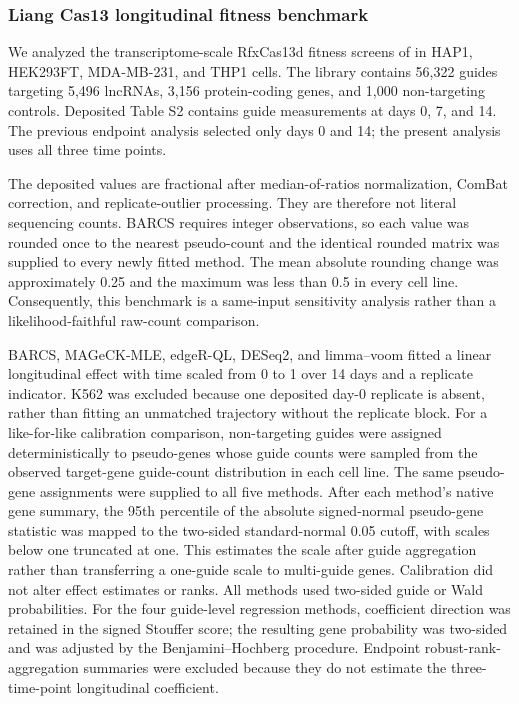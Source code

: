 \subsubsection{Liang Cas13 longitudinal fitness benchmark}

We analyzed the transcriptome-scale RfxCas13d fitness screens of
\citet{liang2026lncrna} in HAP1, HEK293FT, MDA-MB-231, and THP1 cells.
The library contains 56,322 guides targeting 5,496 lncRNAs, 3,156
protein-coding genes, and 1,000 non-targeting controls.  Deposited Table S2
contains guide measurements at days 0, 7, and 14.  The previous endpoint
analysis selected only days 0 and 14; the present analysis uses all three time
points.

The deposited values are fractional after median-of-ratios normalization,
ComBat correction, and replicate-outlier processing.  They are therefore not
literal sequencing counts.  BARCS requires integer observations, so each value
was rounded once to the nearest pseudo-count and the identical rounded matrix
was supplied to every newly fitted method.  The mean absolute rounding change
was approximately 0.25 and the maximum was less than 0.5 in every cell line.
Consequently, this benchmark is a same-input sensitivity analysis rather than
a likelihood-faithful raw-count comparison.

BARCS, MAGeCK-MLE, edgeR-QL, DESeq2, and limma--voom fitted a linear
longitudinal effect with time scaled from 0 to 1 over 14 days and a replicate
indicator.  K562 was excluded because one deposited day-0 replicate is absent,
rather than fitting an unmatched trajectory without the replicate block.
For a like-for-like calibration comparison, non-targeting guides were assigned
deterministically to pseudo-genes whose guide counts were sampled from the
observed target-gene guide-count distribution in each cell line.  The same
pseudo-gene assignments were supplied to all five methods.  After each
method's native gene summary, the 95th percentile of the absolute
signed-normal pseudo-gene statistic was mapped to the two-sided standard-normal
0.05 cutoff, with scales below one truncated at one.  This estimates the scale
after guide aggregation rather than transferring a one-guide scale to
multi-guide genes.  Calibration did not alter effect estimates or ranks.  All
methods used two-sided guide or Wald probabilities.  For the four guide-level
regression methods, coefficient direction was retained in the signed Stouffer
score; the resulting gene probability was two-sided and was adjusted by the
Benjamini--Hochberg procedure.  Endpoint robust-rank-aggregation summaries
\citep{kolde2012rra} were excluded because
they do not estimate the three-time-point longitudinal coefficient.

